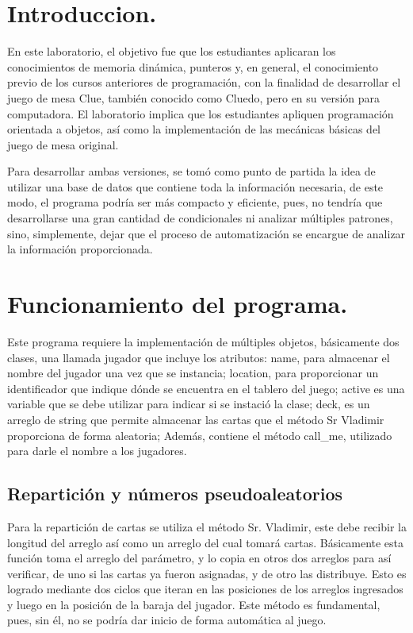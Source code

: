 \tableofcontents
\listoffigures
\newpage

\section{Introduccion.}
	En este laboratorio, el objetivo fue que los estudiantes aplicaran los conocimientos
de memoria dinámica, punteros y, en general, el conocimiento previo de los cursos anteriores
de programación, con la finalidad de desarrollar el juego de mesa Clue, también conocido como
Cluedo, pero en su versión para computadora. El laboratorio implica que los estudiantes apliquen
programación orientada a objetos, así como la implementación de las mecánicas básicas del juego
de mesa original.

Para desarrollar ambas versiones, se tomó como punto de partida la idea de utilizar
una base de datos que contiene toda la información necesaria, de este modo, el programa
podría ser más compacto y eficiente, pues, no tendría que desarrollarse una gran cantidad de
condicionales ni analizar múltiples patrones, sino, simplemente, dejar que el proceso de
automatización se encargue de analizar la información proporcionada.
\section{Funcionamiento del programa.}

	Este programa requiere la implementación de múltiples objetos, básicamente dos clases,
una llamada jugador que incluye los atributos: name, para almacenar el nombre del jugador una 
vez que se instancia; location, para proporcionar un identificador que indique dónde se encuentra
en el tablero del juego; active es una variable que se debe utilizar para indicar si se instació
la clase; deck, es un arreglo de string que permite almacenar las cartas que el método Sr Vladimir
proporciona de forma aleatoria; Además, contiene el método call_me, utilizado para darle el 
nombre a los jugadores.

\subsection{Repartición y números pseudoaleatorios}

	Para la repartición de cartas se utiliza el método Sr. Vladimir, este debe recibir la
longitud del arreglo así como un arreglo del cual tomará cartas. Básicamente esta función toma
el arreglo del parámetro, y lo copia en otros dos arreglos para así verificar, de uno si las 
cartas ya fueron asignadas, y de otro las distribuye. Esto es logrado mediante dos ciclos que
iteran en las posiciones de los arreglos ingresados y luego en la posición de la baraja del 
jugador. Este método es fundamental, pues, sin él, no se podría dar inicio de forma automática
al juego.
	
